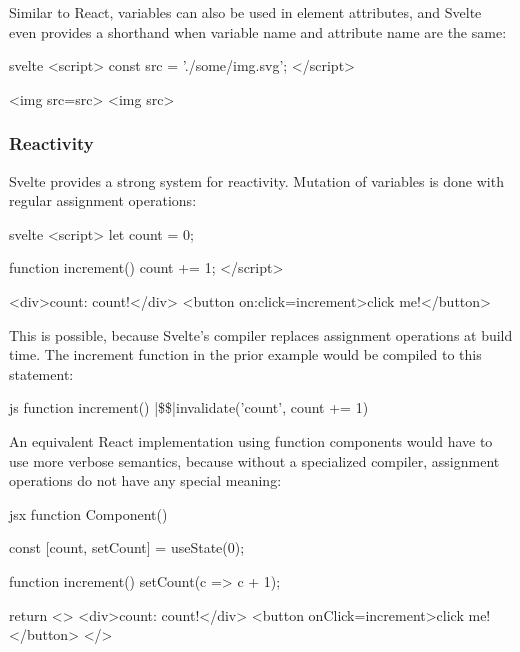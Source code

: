 Similar to React, variables can also be used in element attributes, and Svelte even provides a shorthand when variable name and attribute name are the same:
\begin{myminted}{svelte}{}
<script>
  const src = './some/img.svg';
</script>

<img src={src}>
<img {src}>
\end{myminted}

\subsubsection{Reactivity}

Svelte provides a strong system for reactivity. Mutation of variables is done with regular assignment operations:

\begin{myminted}{svelte}{}
<script>
  let count = 0;

  function increment() {
    count += 1;
  }
</script>

<div>count: {count}!</div>
<button on:click={increment}>click me!</button>
\end{myminted}

This is possible, because Svelte's compiler replaces assignment operations at build time. The increment function in the prior example would be compiled to this statement:

\begin{myminted}[escapeinside=||]{js}{}
function increment() {
  |\$\$|invalidate('count', count += 1)
}
\end{myminted}

An equivalent React implementation using function components would have to use more verbose semantics, because without a specialized compiler, assignment operations do not have any special meaning:

\begin{myminted}{jsx}{}
function Component() {
  const [count, setCount] = useState(0);

  function increment() {
    setCount(c => c + 1);
  }

  return <>
    <div>count: {count}!</div>
    <button onClick={increment}>click me!</button>
  </>
}
\end{myminted}

